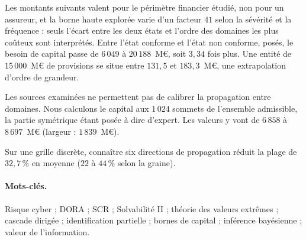 Les montants suivants valent pour le périmètre financier étudié, non pour un assureur,
et la borne haute explorée varie d'un facteur $41$ selon la sévérité et la fréquence : seuls
l'écart entre les deux états et l'ordre des domaines les plus coûteux sont interprétés. Entre
l'état conforme et l'état non conforme, posés, le besoin de capital passe de $6\,049$ à
$20\,188$~M\euro, soit $3{,}34$ fois plus. Une entité de $15\,000$~M\euro{} de provisions se situe
entre $131{,}5$ et $183{,}3$~M\euro, une extrapolation d'ordre de grandeur.

Les sources examinées ne permettent pas de calibrer la propagation entre domaines.
Nous calculons le capital aux $1\,024$ sommets de l'ensemble admissible, la partie
symétrique étant posée à dire d'expert. Les valeurs y vont de $6\,858$ à $8\,697$~M\euro{}
(largeur : $1\,839$~M\euro{}).

Sur une grille discrète, connaître six directions de propagation réduit la plage de $32{,}7\,\%$ en moyenne ($22$ à $44\,\%$ selon la graine).

\paragraph{Mots-clés.} Risque cyber ; DORA ; SCR ; Solvabilité II ; théorie des valeurs
extrêmes ; cascade dirigée ; identification partielle ; bornes de capital ; inférence
bayésienne ; valeur de l'information.



